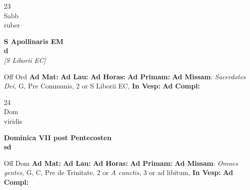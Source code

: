 \documentclass[10pt, openany]{book}
\begin{document}
        \begin{center}
            \begin{minipage}{3.5in}
                \vspace{2em}
                \begin{minipage}{0.5in}
                    {\Huge 23} \\
                    {\normalsize Sabb} \\
                    {\normalsize ruber}
                \end{minipage}
                \begin{minipage}{3.0in}
                    \textbf{ \large S Apollinaris EM \\
                    \textnormal{\normalsize d}} \\ \textit{[S Liborii EC]} \\ 
                \end{minipage}
                \begin{justify}Off Ord
                    \textbf{Ad Mat: }
                    \textbf{Ad Lau: }
                    \textbf{Ad Horas: }
                    \textbf{Ad Primam: }\textbf{Ad Missam}: \textit{Sacerdotes Dei,} G, Pre Communis, 2 or S Liborii EC,  
                    \textbf{In Vesp: }
                    \textbf{Ad Compl: }
                \end{justify}
            \end{minipage}
        \end{center}
    
        \begin{center}
            \begin{minipage}{3.5in}
                \vspace{2em}
                \begin{minipage}{0.5in}
                    {\Huge 24} \\
                    {\normalsize Dom} \\
                    {\normalsize viridis}
                \end{minipage}
                \begin{minipage}{3.0in}
                    \textbf{ \large Dominica VII post Pentecosten \\
                    \textnormal{\normalsize sd}} \\ 
                \end{minipage}
                \begin{justify}Off Dom
                    \textbf{Ad Mat: }
                    \textbf{Ad Lau: }
                    \textbf{Ad Horas: }
                    \textbf{Ad Primam: }\textbf{Ad Missam}: \textit{Omnes gentes,} G, C, Pre de Trinitate, 2 or \textit{A cunctis,} 3 or ad libitum,  
                    \textbf{In Vesp: }
                    \textbf{Ad Compl: }
                \end{justify}
            \end{minipage}
        \end{center}
    
\end{document}
